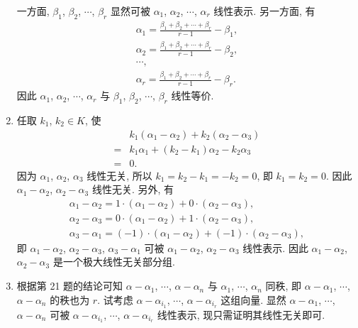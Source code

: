 \documentclass[a4paper, 11pt]{ctexart}
\begin{document}
\begin{enumerate}
            一方面, $\beta_1$, $\beta_2$, $\cdots$, $\beta_r$ 显然可被 $\alpha_1$, $\alpha_2$, $\cdots$, $\alpha_r$ 线性表示. 另一方面, 有
            \begin{gather*}
                \alpha_1 = \frac{\beta_1 + \beta_2 + \cdots + \beta_r}{r - 1} - \beta_1, \\
                \alpha_2 = \frac{\beta_1 + \beta_2 + \cdots + \beta_r}{r - 1} - \beta_2, \\
                \cdots, \\
                \alpha_r = \frac{\beta_1 + \beta_2 + \cdots + \beta_r}{r - 1} - \beta_r.    
            \end{gather*}
            因此 $\alpha_1$, $\alpha_2$, $\cdots$, $\alpha_r$ 与 $\beta_1$, $\beta_2$, $\cdots$, $\beta_r$ 线性等价.
        \item %
            任取 $k_1$, $k_2 \in K$, 使
            \begin{align*}
                    & k_1(\alpha_1 - \alpha_2) + k_2(\alpha_2 - \alpha_3) \\
                ={} & k_1\alpha_1 + (k_2 - k_1)\alpha_2 - k_2\alpha_3 \\
                ={} & 0.
            \end{align*}
            因为 $\alpha_1$, $\alpha_2$, $\alpha_3$ 线性无关, 所以 $k_1 = k_2 - k_1 = -k_2 = 0$, 即 $k_1 = k_2 = 0$.
            因此 $\alpha_1 - \alpha_2$, $\alpha_2 - \alpha_3$ 线性无关. 另外, 有
            \begin{gather*}
                \alpha_1 - \alpha_2 = 1 \cdot (\alpha_1 - \alpha_2) + 0 \cdot (\alpha_2 - \alpha_3), \\
                \alpha_2 - \alpha_3 = 0 \cdot (\alpha_1 - \alpha_2) + 1 \cdot (\alpha_2 - \alpha_3), \\
                \alpha_3 - \alpha_1 = (-1) \cdot (\alpha_1 - \alpha_2) + (-1) \cdot (\alpha_2 - \alpha_3),
            \end{gather*}
            即 $\alpha_1 - \alpha_2$, $\alpha_2 - \alpha_3$, $\alpha_3 - \alpha_1$ 可被 $\alpha_1 - \alpha_2$, $\alpha_2 - \alpha_3$ 线性表示.
            因此 $\alpha_1 - \alpha_2$, $\alpha_2 - \alpha_3$ 是一个极大线性无关部分组.
        \item %
            根据第 21 题的结论可知 $\alpha - \alpha_1$, $\cdots$, $\alpha - \alpha_n$ 与 $\alpha_1$, $\cdots$, $\alpha_n$ 同秩, 即 $\alpha - \alpha_1$, $\cdots$, $\alpha - \alpha_n$ 的秩也为 $r$.
            试考虑 $\alpha - \alpha_{i_1}$, $\cdots$, $\alpha - \alpha_{i_r}$ 这组向量. 显然 $\alpha - \alpha_1$, $\cdots$, $\alpha - \alpha_n$ 可被 $\alpha - \alpha_{i_1}$, $\cdots$, $\alpha - \alpha_{i_r}$ 线性表示, 现只需证明其线性无关即可.


\end{enumerate}
\end{document}
